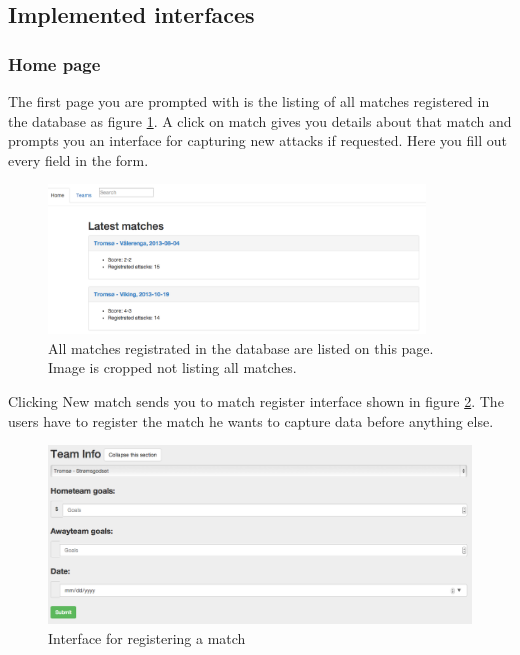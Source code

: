 \subsection{Implemented interfaces}

\subsubsection{Home page}
The first page you are prompted with is the listing of all matches registered in the database as figure \ref{fig:all_matches}. A click on match gives you details about that match and prompts you an interface for capturing new attacks if requested. Here you fill out every field in the form.

\begin{figure}[ht!]
\centering
\includegraphics[width=100mm]{images/interfaces/all_matches.png}
\caption{All matches registrated in the database are listed on this page. Image is cropped not listing all matches.}
\label{fig:all_matches}
\end{figure}

Clicking New match sends you to match register interface shown in figure \ref{fig:reg_match}. The users have to register the match he wants to capture data before anything else.

\begin{figure}[ht!]
\centering
\includegraphics[width=1\textwidth]{images/demo/reg_match.png}
\caption{Interface for registering a match}
\label{fig:reg_match}
\end{figure}


